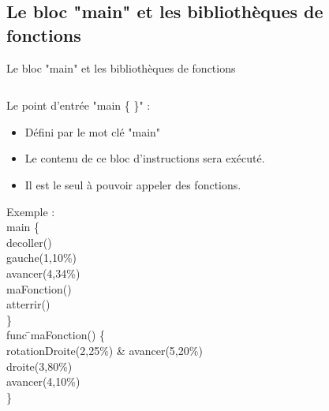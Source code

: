 \documentclass{bredelebeamer}
\begin{document}
\subsection{Le bloc "main" et les bibliothèques de fonctions} 
\begin{frame}{Le bloc "main" et les bibliothèques de fonctions} 

\begin{columns}

\begin{column}{0.5\textwidth}


Le point d'entrée "main \{ \}" :\\
\begin{itemize}
\item Défini par le mot clé "main"
\item Le contenu de ce bloc d'instructions sera exécuté.
\item Il est le seul à pouvoir appeler des fonctions.
\end{itemize}\pause

\begin{tabbing}
Exemple :\=\\
	\>\color{Framarouge}main  \{\=\\ 
	\>\>\color{Framarouge}decoller()\\
	\>\>\color{Framarouge}gauche(\color{black}1\color{Framarouge},\color{Framagris}10\%\color{Framarouge})\\ 
	\>\>\color{Framarouge}avancer(\color{black}4\color{Framarouge},\color{Framagris}34\%\color{Framarouge})\\
	\>\>\color{Framarouge}maFonction()\\ 
	\>\>\color{Framarouge}atterrir()\\
	\>\color{Framarouge}\}\\
	
	\>\color{Framarouge}func \=\color{black}maFonction\color{Framarouge}() \{\\ 
	\>\>\color{Framarouge}rotationDroite(\color{black}2\color{Framarouge},\color{Framagris}25\%\color{Framarouge}) \& 
	\color{Framarouge}avancer(\color{black}5\color{Framarouge},\color{Framagris}20\%\color{Framarouge})\\ 
	\>\>\color{Framarouge}droite(\color{black}3\color{Framarouge},\color{Framagris}80\%\color{Framarouge})\\ 
	\>\>\color{Framarouge}avancer(\color{black}4\color{Framarouge},\color{Framagris}10\%\color{Framarouge})\\ 
	\>\color{Framarouge}\}\pause


\end{tabbing}
\end{column}
\end{columns}
\end{frame}
\end{document}
